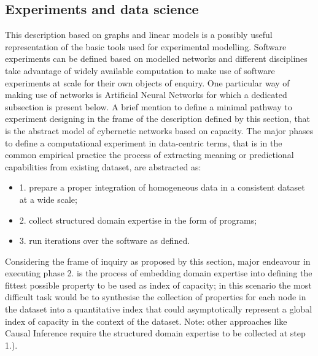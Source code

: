 \documentclass[14pt]{extarticle}
\begin{document}
\subsection*{Experiments and data science}
\label{subsec:experiments}
\hspace*{15mm}This description based on graphs and linear models is a possibly useful representation of the basic tools used for experimental modelling. Software experiments can be defined based on modelled networks and different disciplines take advantage of widely available computation to make use of software experiments at scale for their own objects of enquiry. One particular way of making use of networks is Artificial Neural Networks for which a dedicated subsection is present below.
\newline
A brief mention to define a minimal pathway to experiment designing in the frame of the description defined by this section, that is the abstract model of cybernetic networks based on capacity. The major phases to define a computational experiment in data-centric \cite{Andrewng} terms, that is in the common empirical practice the process of extracting meaning or predictional capabilities from existing dataset, are abstracted as:
\begin{itemize}
\item 1. prepare a proper integration of homogeneous data in a consistent dataset at a wide scale;
\item 2. collect structured domain expertise in the form of programs;
\item 3. run iterations over the software as defined.
\end{itemize}
Considering the frame of inquiry as proposed by this section, major endeavour in executing phase 2. is the process of embedding domain expertise into defining the fittest possible property to be used as index of capacity; in this scenario the most difficult task would be to synthesise the collection of properties for each node in the dataset into a quantitative index that could asymptotically represent a global index of capacity in the context of the dataset. Note: other approaches like Causal Inference \cite{pearl2009causality} require the structured domain expertise to be collected at step 1.).
\newline
\end{document}
